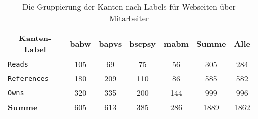         \begin{table}[!h]
            \centering
            \begin{tabular}{|l|c|c|c|c|c|c|}
                \hline
                \multicolumn{1}{|c|}{\textbf{Kanten-Label}} & \textbf{\gls{babw}} & \textbf{\gls{bapvs}} & \textbf{\gls{bscpsy}} & \textbf{\gls{mabm}} & \textbf{Summe} & \textbf{Alle} \\ \hline
                \texttt{Reads}                                       & 105           & 69             & 75              & 56            & 305            & 284           \\ \hline
                \texttt{References}                                  & 180           & 209            & 110             & 86            & 585            & 582           \\ \hline
                \texttt{Owns}                                        & 320           & 335            & 200             & 144           & 999            & 996           \\ \hline
                \hline
                \textbf{Summe}                              & 605           & 613            & 385             & 286           & 1889           & 1862          \\ \hline
            \end{tabular}
            \caption{Die Gruppierung der Kanten nach Labels für Webseiten über Mitarbeiter}
            \label{table:findingTeachersFiguresEdgesByLabel}
        \end{table}

